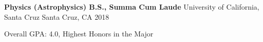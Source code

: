 \begin{cventries}
  \cventry
    {\textbf{Physics (Astrophysics) B.S., Summa Cum Laude}}
    {University of California, Santa Cruz}
    {Santa Cruz, CA}
    {2018}
    {
      \vspace{1mm}
      \begin{cvitems}
       \item {Overall GPA: 4.0, Highest Honors in the Major}
      \end{cvitems}
  }

\end{cventries}
